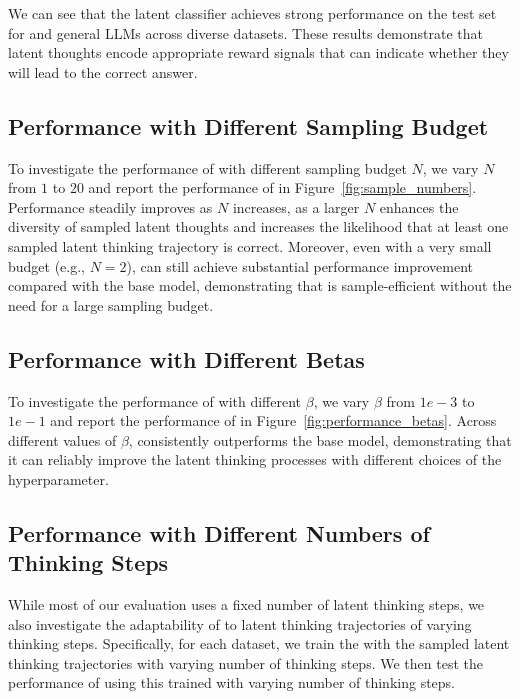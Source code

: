 \documentclass{article} %
\begin{document}
We can see that the latent classifier achieves strong performance on the test set for \LRLM and general LLMs across diverse datasets. These results demonstrate that latent thoughts encode appropriate reward signals that can indicate whether they will lead to the correct answer.
\subsection{Performance with Different Sampling Budget}
\label{appendix:performance_sampling_budget}
To investigate the performance of \LTO with different sampling budget $N$, we vary $N$ from $1$ to $20$ and report the performance of \LTO in Figure~\ref{fig:sample_numbers}.
%
Performance steadily improves as $N$ increases, as a larger $N$ enhances the diversity of sampled latent thoughts and increases the likelihood that at least one sampled latent thinking trajectory is correct. 
%
Moreover, even with a very small budget (e.g., $N=2$), \LTO can still achieve substantial performance improvement compared with the base model, demonstrating that \LTO is sample-efficient without the need for a large sampling budget.
\subsection{Performance with Different Betas}
\label{appendix:performance_betas}
To investigate the performance of \LTO with different $\beta$, we vary $\beta$ from $1e-3$ to $1e-1$ and report the performance of \LTO in Figure~\ref{fig:performance_betas}.
%
Across different values of $\beta$, \LTO consistently outperforms the base model, demonstrating that it can reliably improve the latent thinking processes with different choices of the hyperparameter.
\subsection{Performance with Different Numbers of Thinking Steps}\label{sec:performance_thinking_steps}


While most of our evaluation uses a fixed number of latent thinking steps, we also investigate the adaptability of \LTO to latent thinking trajectories of varying thinking steps. 
%
Specifically, for each dataset, we train the \LRM with the sampled latent thinking trajectories with varying number of thinking steps. We then test the performance of \LTO using this \LRM trained with varying number of thinking steps. 
\end{document}
